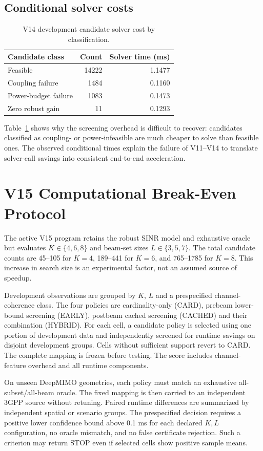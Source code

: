 \documentclass[journal]{IEEEtran}
\begin{document}
\subsection{Conditional solver costs}
\begin{table}[t]
\caption{V14 development candidate solver cost by classification.}
\label{tab:cost}\centering\footnotesize
\begin{tabular}{lrr}\toprule
Candidate class & Count & Solver time (ms)\\\midrule
Feasible & 14222 & 1.1477\\
Coupling failure & 1484 & 0.1160\\
Power-budget failure & 1083 & 0.1473\\
Zero robust gain & 11 & 0.1293\\\bottomrule
\end{tabular}
\end{table}
Table~\ref{tab:cost} shows why the screening overhead is difficult to recover: candidates classified as coupling- or power-infeasible are much cheaper to solve than feasible ones. The observed conditional times explain the failure of V11--V14 to translate solver-call savings into consistent end-to-end acceleration.

\section{V15 Computational Break-Even Protocol}
The active V15 program retains the robust SINR model and exhaustive oracle but evaluates $K\in\{4,6,8\}$ and beam-set sizes $L\in\{3,5,7\}$. The total candidate counts are 45--105 for $K=4$, 189--441 for $K=6$, and 765--1785 for $K=8$. This increase in search size is an experimental factor, not an assumed source of speedup.

Development observations are grouped by $K$, $L$ and a prespecified channel-coherence class. The four policies are cardinality-only (CARD), prebeam lower-bound screening (EARLY), postbeam cached screening (CACHED) and their combination (HYBRID). For each cell, a candidate policy is selected using one portion of development data and independently screened for runtime savings on disjoint development groups. Cells without sufficient support revert to CARD. The complete mapping is frozen before testing. The score includes channel-feature overhead and all runtime components.

On unseen DeepMIMO geometries, each policy must match an exhaustive all-subset/all-beam oracle. The fixed mapping is then carried to an independent 3GPP source without retuning. Paired runtime differences are summarized by independent spatial or scenario groups. The prespecified decision requires a positive lower confidence bound above 0.1 ms for each declared $K,L$ configuration, no oracle mismatch, and no false certificate rejection. Such a criterion may return STOP even if selected cells show positive sample means.
\end{document}

